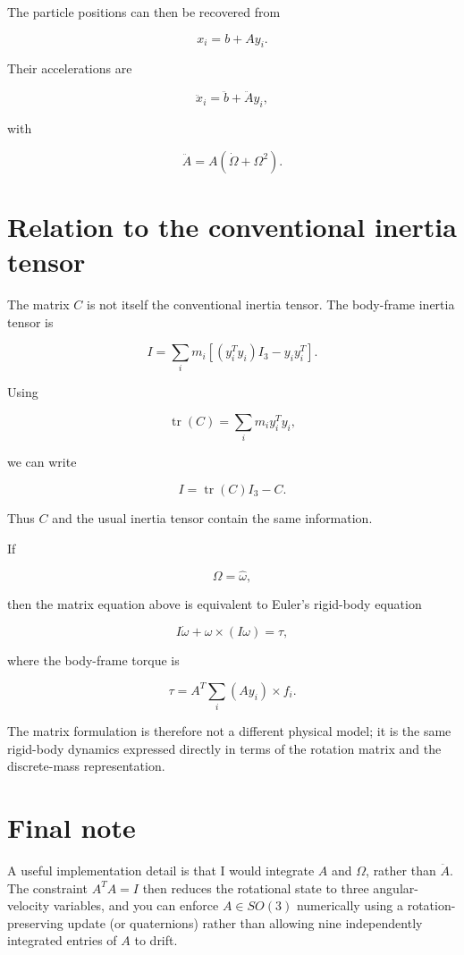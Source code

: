 \documentclass{article}
\begin{document}
The particle positions can then be recovered from

\[
x_i=b+Ay_i.
\]

Their accelerations are

\[
\ddot x_i = \ddot b+\ddot A y_i,
\]

with

\[
\ddot A = A(\dot\Omega+\Omega^2).
\]

\section{Relation to the conventional inertia tensor}

The matrix \(C\) is not itself the conventional inertia tensor. The body-frame inertia tensor is

\[
I = \sum_i m_i \left[ (y_i^Ty_i)I_3-y_i y_i^T \right].
\]

Using

\[
\operatorname{tr}(C) = \sum_i m_i y_i^Ty_i,
\]

we can write

\[
I = \operatorname{tr}(C)I_3-C.
\]

Thus \(C\) and the usual inertia tensor contain the same information.

If

\[
\Omega=\widehat{\omega},
\]

then the matrix equation above is equivalent to Euler's rigid-body equation

\[
I\dot\omega+\omega\times(I\omega)=\tau,
\]

where the body-frame torque is

\[
\tau = A^T \sum_i(Ay_i)\times f_i.
\]

The matrix formulation is therefore not a different physical model;
it is the same rigid-body dynamics expressed directly in terms of the rotation matrix and the discrete-mass representation.


\section{Final note}

A useful implementation detail is that I would integrate \(A\) and \(\Omega\), rather than \(\ddot A\).
The constraint \(A^TA=I\) then reduces the rotational state to three angular-velocity variables,
and you can enforce \(A\in SO(3)\) numerically using a rotation-preserving update (or quaternions)
rather than allowing nine independently integrated entries of \(A\) to drift.
\end{document}
